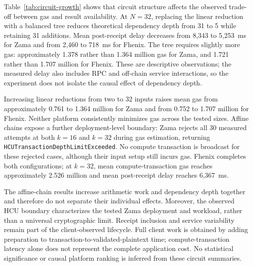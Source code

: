 Table~\ref{tab:circuit-growth} shows that circuit structure affects the observed trade-off between gas and result availability. At $N=32$, replacing the linear reduction with a balanced tree reduces theoretical dependency depth from 31 to 5 while retaining 31 additions. Mean post-receipt delay decreases from 8,343 to 5,253~ms for Zama and from 2,460 to 718~ms for Fhenix. The tree requires slightly more gas: approximately 1.378 rather than 1.364 million gas for Zama, and 1.721 rather than 1.707 million for Fhenix. These are descriptive observations; the measured delay also includes RPC and off-chain service interactions, so the experiment does not isolate the causal effect of dependency depth.

Increasing linear reductions from two to 32 inputs raises mean gas from approximately 0.761 to 1.364 million for Zama and from 0.752 to 1.707 million for Fhenix. Neither platform consistently minimizes gas across the tested sizes. Affine chains expose a further deployment-level boundary: Zama rejects all 30 measured attempts at both $k=16$ and $k=32$ during gas estimation, returning \texttt{HCUTransactionDepthLimitExceeded}. No compute transaction is broadcast for these rejected cases, although their input setup still incurs gas. Fhenix completes both configurations; at $k=32$, mean compute-transaction gas reaches approximately 2.526 million and mean post-receipt delay reaches 6,367~ms.

The affine-chain results increase arithmetic work and dependency depth together and therefore do not separate their individual effects. Moreover, the observed HCU boundary characterizes the tested Zama deployment and workload, rather than a universal cryptographic limit. Receipt inclusion and service variability remain part of the client-observed lifecycle. Full client work is obtained by adding preparation to transaction-to-validated-plaintext time; compute-transaction latency alone does not represent the complete application cost. No statistical significance or causal platform ranking is inferred from these circuit summaries.
